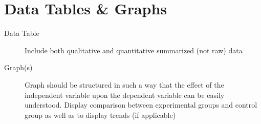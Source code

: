 \part{Data Tables \& Graphs}


\begin{description}
    \item[Data Table] Include both qualitative and quantitative summarized (not
        raw) data
    \item[Graph(s)] Graph should be structured in such a way that the effect of
        the independent variable upon the dependent variable can be easily
        understood. Display comparison between experimental groups and control
        group as well as to display trends (if applicable)
\end{description}
